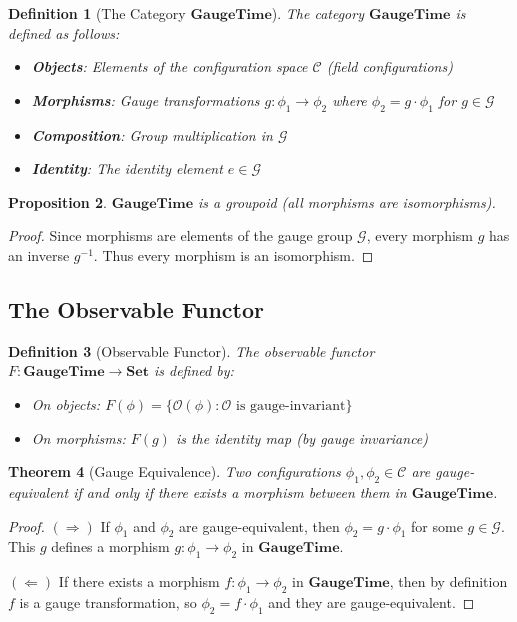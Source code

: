 \documentclass[12pt,a4paper]{article}
\newtheorem{theorem}{Theorem}[section]
\newtheorem{proposition}[theorem]{Proposition}
\newtheorem{definition}[theorem]{Definition}
\newcommand{\Cat}[1]{\mathbf{#1}}
\newcommand{\Set}{\Cat{Set}}
\newcommand{\GaugeGroup}{\mathcal{G}}
\newcommand{\Config}{\mathcal{C}}
\begin{document}
\begin{definition}[The Category $\mathbf{GaugeTime}$]
The category $\mathbf{GaugeTime}$ is defined as follows:
\begin{itemize}
\item \textbf{Objects}: Elements of the configuration space $\Config$ (field configurations)
\item \textbf{Morphisms}: Gauge transformations $g: \phi_1 \to \phi_2$ where $\phi_2 = g \cdot \phi_1$ for $g \in \GaugeGroup$
\item \textbf{Composition}: Group multiplication in $\GaugeGroup$
\item \textbf{Identity}: The identity element $e \in \GaugeGroup$
\end{itemize}
\end{definition}

\begin{proposition}
$\mathbf{GaugeTime}$ is a groupoid (all morphisms are isomorphisms).
\end{proposition}

\begin{proof}
Since morphisms are elements of the gauge group $\GaugeGroup$, every morphism $g$ has an inverse $g^{-1}$. Thus every morphism is an isomorphism.
\end{proof}

\subsection{The Observable Functor}

\begin{definition}[Observable Functor]
The observable functor $F: \mathbf{GaugeTime} \to \Set$ is defined by:
\begin{itemize}
\item On objects: $F(\phi) = \{\mathcal{O}(\phi) : \mathcal{O} \text{ is gauge-invariant}\}$
\item On morphisms: $F(g)$ is the identity map (by gauge invariance)
\end{itemize}
\end{definition}

\begin{theorem}[Gauge Equivalence]
Two configurations $\phi_1, \phi_2 \in \Config$ are gauge-equivalent if and only if there exists a morphism between them in $\mathbf{GaugeTime}$.
\end{theorem}

\begin{proof}
$(\Rightarrow)$ If $\phi_1$ and $\phi_2$ are gauge-equivalent, then $\phi_2 = g \cdot \phi_1$ for some $g \in \GaugeGroup$. This $g$ defines a morphism $g: \phi_1 \to \phi_2$ in $\mathbf{GaugeTime}$.

$(\Leftarrow)$ If there exists a morphism $f: \phi_1 \to \phi_2$ in $\mathbf{GaugeTime}$, then by definition $f$ is a gauge transformation, so $\phi_2 = f \cdot \phi_1$ and they are gauge-equivalent.
\end{proof}
\end{document}
